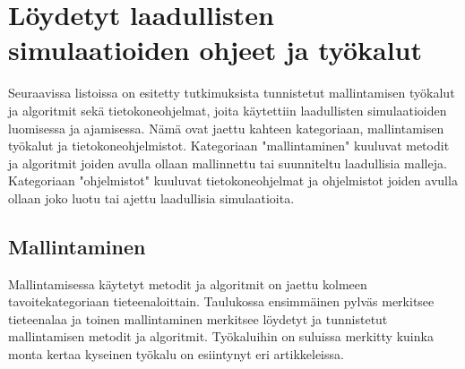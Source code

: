 \documentclass[utf8]{gradu3}
\begin{document}
\section{Löydetyt laadullisten simulaatioiden ohjeet ja työkalut} \label{tyokalut}
Seuraavissa listoissa on esitetty tutkimuksista tunnistetut mallintamisen työkalut 
ja algoritmit sekä tietokoneohjelmat,
joita käytettiin laadullisten simulaatioiden luomisessa ja ajamisessa. 
Nämä ovat jaettu kahteen kategoriaan, mallintamisen työkalut 
ja tietokoneohjelmistot. 
Kategoriaan "mallintaminen" kuuluvat metodit ja algoritmit 
joiden avulla ollaan mallinnettu tai suunniteltu laadullisia malleja.
Kategoriaan "ohjelmistot" kuuluvat tietokoneohjelmat ja ohjelmistot 
joiden avulla ollaan joko luotu tai ajettu laadullisia simulaatioita.

\subsection{Mallintaminen}
Mallintamisessa käytetyt metodit ja algoritmit on jaettu kolmeen
tavoitekategoriaan tieteenaloittain. Taulukossa ensimmäinen pylväs merkitsee
tieteenalaa  ja toinen mallintaminen merkitsee löydetyt ja tunnistetut 
mallintamisen metodit ja algoritmit. Työkaluihin on suluissa merkitty 
kuinka monta kertaa kyseinen työkalu on esiintynyt eri artikkeleissa.
\end{document}

